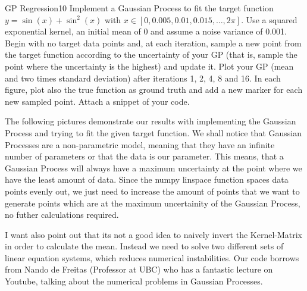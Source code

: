 \newif\ifvimbug
\vimbugfalse

\ifvimbug

\fi

\begin{questions}


\begin{question}{GP Regression}{10}
Implement a Gaussian Process to fit the target function $y = \sin(x) + \sin^2(x)$ with $x \in [0, 0.005, 0.01, 0.015, \ldots, 2\pi]$. Use a squared exponential kernel, an initial mean of 0 and assume a noise variance of 0.001. Begin with no target data points and, at each iteration, sample a new point from the target function according to the uncertainty of your GP (that is, sample the point where the uncertainty is the highest) and update it. Plot your GP (mean and two times standard deviation) after iterations 1, 2, 4, 8 and 16.
In each figure, plot also the true function as ground truth and add a new marker for each new sampled point. Attach a snippet of your code.

\begin{answer}
The following pictures demonstrate our results with implementing the Gaussian Process and trying to fit the given target function. We shall notice that Gaussian Processes are a non-parametric model, meaning that they have an infinite number of parameters or that the data is our parameter. This means, that a Gaussian Process will always have a maximum uncertainty at the point where we have the least amount of data. Since the numpy linspace function spaces data points evenly out, we just need to increase the amount of points that we want to generate points which are at the maximum uncertainity of the Gaussian Process, no futher calculations required. 

I want also point out that its not a good idea to naively invert the Kernel-Matrix in order to calculate the mean. Instead we need to solve two different sets of linear equation systems, which reduces numerical instabilities. Our code borrows from Nando de Freitas (Professor at UBC) who has a fantastic lecture on Youtube, talking about the numerical problems in Gaussian Processes.
\end{answer}


\end{question}
\end{questions}
